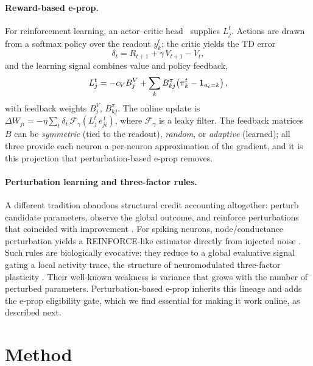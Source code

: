 \documentclass[10pt,twocolumn]{article}
\newcommand{\method}{perturbation-based e-prop}   %
\newcommand{\Method}{Perturbation-based e-prop}   %
\begin{document}
\paragraph{Reward-based e-prop.}
For reinforcement learning, an actor--critic head~\citep{Konda2000ActorCritic} supplies $L^t_j$. Actions are
drawn from a softmax policy over the readout $y^t_k$; the critic yields the
TD error
\begin{equation}
\delta_t = R_{t+1} + \gamma\, V_{t+1} - V_t,
\label{eq:tderror}
\end{equation}
and the learning signal combines value and policy feedback,
\begin{equation}
L^t_j = -c_V B^V_j + \sum_k B^\pi_{kj}\!\left(\pi^t_k - \mathbbm{1}_{a_t=k}\right),
\label{eq:learning-signal}
\end{equation}
with feedback weights $B^V_j$, $B^\pi_{kj}$. The online update is
$\Delta W_{ji} = -\eta\sum_t \delta_t\,\mathcal{F}_{\gamma}(L^t_j\,\bar
e^{\,t}_{ji})$, where $\mathcal{F}_{\gamma}$ is a leaky filter. The feedback
matrices $B$ can be \emph{symmetric} (tied to the readout), \emph{random}, or
\emph{adaptive} (learned); all three provide each neuron a per-neuron
approximation of the gradient, and it is this projection that \method{} removes.

\paragraph{Perturbation learning and three-factor rules.}
A different tradition abandons structural credit accounting altogether:
perturb candidate parameters, observe the global outcome, and reinforce
perturbations that coincided with improvement
\citep{salimans2017evolutionstrategiesscalablealternative}. For spiking
neurons, node/conductance perturbation yields a REINFORCE-like estimator
directly from injected noise \citep{fiete2006gradient}. Such rules are
biologically evocative: they reduce to a global evaluative signal gating a
local activity trace, the structure of neuromodulated three-factor plasticity
\citep{Fremaux2016NeuromodulatedSTDP,Izhikevich2007DistalReward,
Florian2007RewardSTDP}. Their well-known weakness is variance that grows with
the number of perturbed parameters. \Method{} inherits this lineage
and adds the e-prop eligibility gate, which we find essential for making it
work online, as described next.

\section{Method}
\label{sec:method}
\end{document}
